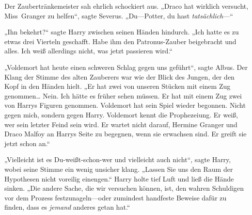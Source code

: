 Der Zaubertränkemeister sah ehrlich schockiert aus. „Draco hat wirklich versucht, Miss~Granger zu helfen“, sagte Severus. „Du—Potter, du hast \emph{tatsächlich}—“

„Ihn bekehrt?“ sagte Harry zwischen seinen Händen hindurch. „Ich hatte es zu etwas drei Vierteln geschafft. Habe ihm den Patronus-Zauber beigebracht und alles. Ich weiß allerdings nicht, was jetzt passieren wird.“

„Voldemort hat heute einen schweren Schlag gegen uns geführt“, sagte Albus. Der Klang der Stimme des alten Zauberers war wie der Blick des Jungen, der den Kopf in den Händen hielt. „Er hat zwei von unseren Stücken mit einem Zug genommen… Nein. Ich hätte es früher sehen müssen. Er hat mit einem Zug zwei von Harrys Figuren genommen. Voldemort hat sein Spiel wieder begonnen. Nicht gegen mich, sondern gegen Harry. Voldemort kennt die Prophezeiung. Er weiß, wer sein letzter Feind sein wird. Er wartet nicht darauf, Hermine Granger und Draco Malfoy an Harrys Seite zu begegnen, wenn sie erwachsen sind. Er greift sie jetzt schon an.“

„Vielleicht ist es Du-weißt-schon-wer und vielleicht auch nicht“, sagte Harry, wobei seine Stimme ein wenig unsicher klang. „Lassen Sie uns den Raum der Hypothesen nicht voreilig einengen.“ Harry holte tief Luft und ließ die Hände sinken. „Die andere Sache, die wir versuchen können, ist, den wahren Schuldigen vor dem Prozess festzunageln—oder zumindest handfeste Beweise dafür zu finden, dass es \emph{jemand} anderes getan hat.“

